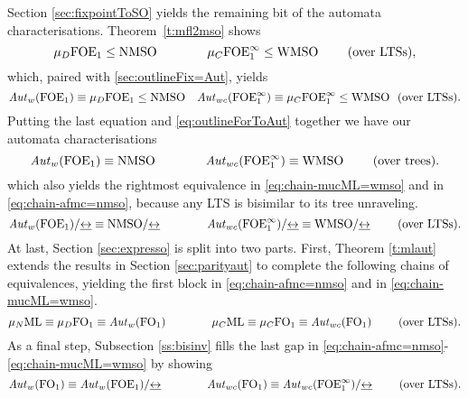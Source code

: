 Section \ref{sec:fixpointToSO} yields the remaining bit of the automata characterisations. Theorem~\ref{t:mfl2mso} shows
\[ \mu_{D}\ofoe \leq \nmso \qquad \qquad \mu_{C}\ofoei \leq \wmso  \qquad \text{ (over LTSs)},\]
which, paired with \eqref{sec:outlineFix=Aut}, yields
\begin{equation*}%
	 \AutW(\ofoe) \equiv \mu_{D}\ofoe \leq \nmso \quad \AutWC(\ofoei) \equiv \mu_{C}\ofoei \leq \wmso \ \text{ (over LTSs)}.
\end{equation*}
 Putting the last equation and \eqref{eq:outlineForToAut} together we have our automata characterisations
 \begin{equation*}
 \AutW(\ofoe) \equiv \nmso \qquad \qquad  {\AutWC(\ofoei)} \equiv \wmso \qquad \text{ (over trees)}.
 \end{equation*}
 which also yields the rightmost equivalence in \eqref{eq:chain-mucML=wmso} and in \eqref{eq:chain-afmc=nmso}, because any LTS is bisimilar to its tree unraveling.
  \begin{equation*}
 \AutW(\ofoe)/{\bis} \equiv \nmso/{\bis} \qquad \qquad {\AutWC(\ofoei)}/{\bis} \equiv \wmso/{\bis} \qquad \text{ (over LTSs)}.
 \end{equation*}
At last, Section \eqref{sec:expresso} is split into two parts. 
First, Theorem \ref{t:mlaut} extends the results in Section \ref{sec:parityaut} 
to complete the following chains of equivalences, yielding the first block 
in \eqref{eq:chain-afmc=nmso} and in \eqref{eq:chain-mucML=wmso}.
\[ 
\AFMC \equiv \mu_{D}\ofo \equiv \AutW(\ofo) \qquad \qquad 
\mucML \equiv \mu_{C}\ofo \equiv \AutWC(\ofo)  \qquad \text{ (over LTSs)}. 
\]
As a final step, Subsection \ref{ss:bisinv} fills the last gap 
in \eqref{eq:chain-afmc=nmso}-\eqref{eq:chain-mucML=wmso} by showing
\[ 
\AutW(\ofo) \equiv \AutW(\ofoe)/{\bis} \qquad \qquad 
\AutWC(\ofo) \equiv \AutWC(\ofoei)/{\bis} \qquad \text{ (over LTSs)}.
\]

  
